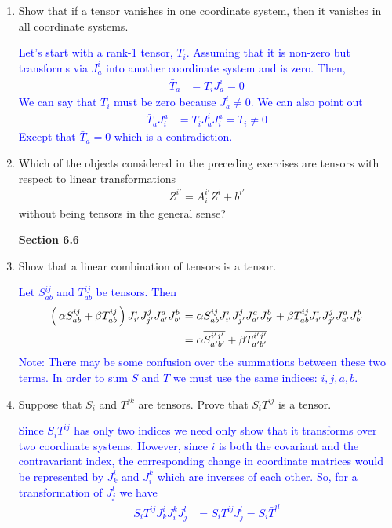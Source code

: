 \documentclass[12pt,a4paper]{report}
\newcommand{\BLUE}[1]{\textcolor{blue}{#1}}
\begin{document}
\begin{enumerate}[label=\textbf{\arabic*.}]
\item Show that if a tensor vanishes in one coordinate system, then it vanishes in all coordinate systems.

\BLUE{Let's start with a rank-1 tensor, $T_i$.  Assuming that it is non-zero but transforms via $J^i_a$ into another coordinate system and is zero.  Then,
\begin{align*}
	\bar{T}_a &= T_iJ^i_a = 0
\end{align*}We can say that $T_i$ must be zero because $J^i_a \ne 0$.  We can also point out 
\begin{align*}
	\bar{T}_aJ^a_i &= T_iJ^i_aJ^a_i = T_i \ne 0
\end{align*} Except that $\bar{T}_a = 0$ which is a contradiction.
}

\item Which of the objects considered in the preceding exercises are tensors with respect to linear transformations
\begin{align*}
	Z^{i'}=A^{i'}_iZ^i+b^{i'}
\end{align*}without being tensors in the general sense?

\textbf{Section 6.6}
\item Show that a linear combination of tensors is a tensor.

\newcommand{\BOTH}[1]{J^{#1}_{#1'}}
\BLUE{Let $S^{ij}_{ab}$ and $T^{ij}_{ab}$ be tensors.  Then
\begin{align*}
	\PAREN{\alpha S^{ij}_{ab}+ \beta T^{ij}_{ab}}\BOTH{i}\BOTH{j}\BOTH{a}\BOTH{b} &= \alpha S^{ij}_{ab}\BOTH{i}\BOTH{j}\BOTH{a}\BOTH{b}+\beta T^{ij}_{ab}\BOTH{i}\BOTH{j}\BOTH{a}\BOTH{b} \\
	&= \alpha\CONJ{S^{i'j'}_{a'b'}}+\beta\CONJ{T^{i'j'}_{a'b'}}
\end{align*}Note: There may be some confusion over the summations between these two terms.  In order to sum $S$ and $T$ we must use the same indices: $i,j,a,b$.  
}

\item Suppose that $S_i$ and $T^{jk}$ are tensors.  Prove that $S_iT^{ij}$ is a tensor.

\BLUE{Since $S_iT^{ij}$ has only two indices we need only show that it transforms over two coordinate systems.  However, since $i$ is both the covariant and the contravariant index, the corresponding change in coordinate matrices would be represented by $J^i_k$ and $J^k_i$ which are inverses of each other.  So, for a transformation of $J^l_j$ we have
\begin{align*}
	S_iT^{ij}J^i_kJ^k_iJ^l_j &= S_iT^{ij}J^l_j = S_i\bar{T}^{il}
\end{align*}
}


\end{enumerate}
\end{document}
